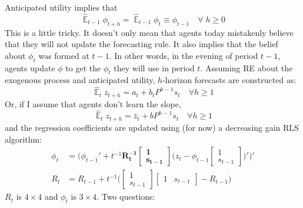 \documentclass[11pt]{article}
\renewcommand{\[}{\begin{equation}}
\renewcommand{\]}{\end{equation}}
\DeclareMathOperator{\E}{\mathbb{E}}
\begin{document}
Anticipated utility implies that
\begin{equation}
\hat{\E}_{t-1}{\phi_{t+h}} = \hat{\E}_{t-1}{\phi_{t}} \equiv \phi_{t-1} \quad \forall \; h\geq0 
\end{equation}
This is a little tricky. It doesn't only mean that agents today mistakenly believe that they will not update the forecasting rule. It also implies that the belief about $\phi_t$ was formed at $t-1$. In other words, in the evening of period $t-1$, agents update $\phi$ to get the $\phi_t$ they will use in period $t$.
Assuming RE about the exogenous process and anticipated utility, $h$-horizon forecasts are constructed as:
\begin{equation}
\hat{\E}_t z_{t+h} = a_{t} + b_{t}P^{h-1}s_t  \quad \forall h\geq 1 \label{PLM_fcst_general}
\end{equation}
Or, if I assume that agents don't learn the slope, 
\begin{equation}
\hat{\E}_t z_{t+h} = \bar{z}_{t} + bP^{h-1}s_t  \quad \forall h\geq 1 \label{PLM_fcst}
\end{equation}
and the regression coefficients are updated using (for now) a decreasing gain RLS algorithm:
\begin{align}
\phi_t  & = \bigg( \phi_{t-1}' + t^{-1} \mathbf{R_t^{-1}}\begin{bmatrix} \mathbf{1} \\ \mathbf{s_{t-1}} \end{bmatrix}\bigg(z_{t} - \phi_{t-1} \begin{bmatrix} 1 \\ s_{t-1} \end{bmatrix} \bigg)' \bigg)' \\
R_t &= R_{t-1} +  t^{-1} \bigg( \begin{bmatrix} 1 \\ s_{t-1} \end{bmatrix} \begin{bmatrix} 1 & s_{t-1} \end{bmatrix}  - R_{t-1} \bigg)
\end{align}
$R_t$ is $4\times 4$ and $\phi_t$ is $3 \times 4$. Two questions:
\end{document}
